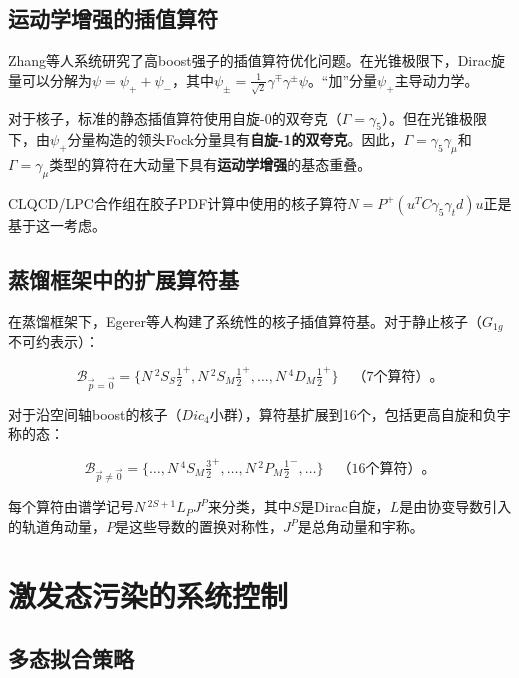 \documentclass[12pt,a4paper]{ctexart}
\theoremstyle{definition}
\begin{document}
\subsection{运动学增强的插值算符}

Zhang等人\cite{Zhang2025kinematic}系统研究了高boost强子的插值算符优化问题。在光锥极限下，Dirac旋量可以分解为$\psi = \psi_+ + \psi_-$，其中$\psi_\pm = \frac{1}{\sqrt{2}}\gamma^\mp\gamma^\pm\psi$。``加''分量$\psi_+$主导动力学。

对于核子，标准的静态插值算符使用自旋-0的双夸克（$\Gamma = \gamma_5$）。但在光锥极限下，由$\psi_+$分量构造的领头Fock分量具有\textbf{自旋-1的双夸克}。因此，$\Gamma = \gamma_5\gamma_\mu$和$\Gamma = \gamma_\mu$类型的算符在大动量下具有\textbf{运动学增强}的基态重叠\cite{Zhang2025kinematic}。

CLQCD/LPC合作组在胶子PDF计算中使用的核子算符$N = P^+(u^T C\gamma_5\gamma_t d)u$正是基于这一考虑\cite{Chen2025gluon}。

\subsection{蒸馏框架中的扩展算符基}

在蒸馏框架下，Egerer等人\cite{Egerer2021a}构建了系统性的核子插值算符基。对于静止核子（$G_{1g}$不可约表示）：

\begin{equation}
\mathcal{B}_{\vec{p}=\vec{0}} = \{N\,^2S_S\tfrac{1}{2}^+, N\,^2S_M\tfrac{1}{2}^+, \ldots, N\,^4D_M\tfrac{1}{2}^+\} \quad \text{（7个算符）}。
\label{eq:basis_rest}
\end{equation}

对于沿空间轴boost的核子（$Dic_4$小群），算符基扩展到16个，包括更高自旋和负宇称的态：

\begin{equation}
\mathcal{B}_{\vec{p}\neq\vec{0}} = \{\ldots, N\,^4S_M\tfrac{3}{2}^+, \ldots, N\,^2P_M\tfrac{1}{2}^-, \ldots\} \quad \text{（16个算符）}。
\label{eq:basis_boosted}
\end{equation}

每个算符由谱学记号$N\,^{2S+1}L_P J^P$来分类\cite{Egerer2021a}，其中$S$是Dirac自旋，$L$是由协变导数引入的轨道角动量，$P$是这些导数的置换对称性，$J^P$是总角动量和宇称。

\section{激发态污染的系统控制}

\subsection{多态拟合策略}
\end{document}
